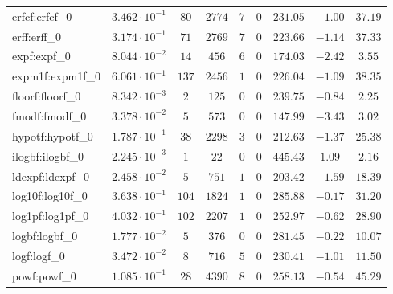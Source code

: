\begin{tabular}{|l|c|c|c|c|c|c|c|c|}
erfcf:erfcf\_0               & $ 3.462 \cdot 10^{-1} $ & $ 80     $ & $ 2774  $ & $ 7   $ & $ 0   $ & $ 231.05      $ & $ -1.00   $ & $ 37.19   $ \\
erff:erff\_0                 & $ 3.174 \cdot 10^{-1} $ & $ 71     $ & $ 2769  $ & $ 7   $ & $ 0   $ & $ 223.66      $ & $ -1.14   $ & $ 37.33   $ \\
expf:expf\_0                 & $ 8.044 \cdot 10^{-2} $ & $ 14     $ & $ 456   $ & $ 6   $ & $ 0   $ & $ 174.03      $ & $ -2.42   $ & $ 3.55    $ \\
expm1f:expm1f\_0             & $ 6.061 \cdot 10^{-1} $ & $ 137    $ & $ 2456  $ & $ 1   $ & $ 0   $ & $ 226.04      $ & $ -1.09   $ & $ 38.35   $ \\
floorf:floorf\_0             & $ 8.342 \cdot 10^{-3} $ & $ 2      $ & $ 125   $ & $ 0   $ & $ 0   $ & $ 239.75      $ & $ -0.84   $ & $ 2.25    $ \\
fmodf:fmodf\_0               & $ 3.378 \cdot 10^{-2} $ & $ 5      $ & $ 573   $ & $ 0   $ & $ 0   $ & $ 147.99      $ & $ -3.43   $ & $ 3.02    $ \\
hypotf:hypotf\_0             & $ 1.787 \cdot 10^{-1} $ & $ 38     $ & $ 2298  $ & $ 3   $ & $ 0   $ & $ 212.63      $ & $ -1.37   $ & $ 25.38   $ \\
ilogbf:ilogbf\_0             & $ 2.245 \cdot 10^{-3} $ & $ 1      $ & $ 22    $ & $ 0   $ & $ 0   $ & $ 445.43      $ & $ 1.09    $ & $ 2.16    $ \\
ldexpf:ldexpf\_0             & $ 2.458 \cdot 10^{-2} $ & $ 5      $ & $ 751   $ & $ 1   $ & $ 0   $ & $ 203.42      $ & $ -1.59   $ & $ 18.39   $ \\
log10f:log10f\_0             & $ 3.638 \cdot 10^{-1} $ & $ 104    $ & $ 1824  $ & $ 1   $ & $ 0   $ & $ 285.88      $ & $ -0.17   $ & $ 31.20   $ \\
log1pf:log1pf\_0             & $ 4.032 \cdot 10^{-1} $ & $ 102    $ & $ 2207  $ & $ 1   $ & $ 0   $ & $ 252.97      $ & $ -0.62   $ & $ 28.90   $ \\
logbf:logbf\_0               & $ 1.777 \cdot 10^{-2} $ & $ 5      $ & $ 376   $ & $ 0   $ & $ 0   $ & $ 281.45      $ & $ -0.22   $ & $ 10.07   $ \\
logf:logf\_0                 & $ 3.472 \cdot 10^{-2} $ & $ 8      $ & $ 716   $ & $ 5   $ & $ 0   $ & $ 230.41      $ & $ -1.01   $ & $ 11.50   $ \\
powf:powf\_0                 & $ 1.085 \cdot 10^{-1} $ & $ 28     $ & $ 4390  $ & $ 8   $ & $ 0   $ & $ 258.13      $ & $ -0.54   $ & $ 45.29   $ \\

\end{tabular}
